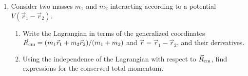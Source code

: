 \begin{enumerate}
\item Consider two masses $m_1$ and $m_2$ interacting according to a
  potential $V(\vec{r}_1-\vec{r}_2)$.
\begin{enumerate}
\item Write the Lagrangian in terms of the generalized coordinates
  $\vec{R}_{\rm cm}=(m_1\vec{r}_1+m_2\vec{r}_2)/(m_1+m_2)$ and
  $\vec{r}=\vec{r}_1-\vec{r}_2$, and their derivatives.
\item Using the independence of the Lagrangian with respect to
  $\vec{R}_{\rm cm}$, find expressions for the conserved total
  momentum.
\end{enumerate}

\end{enumerate}
%

